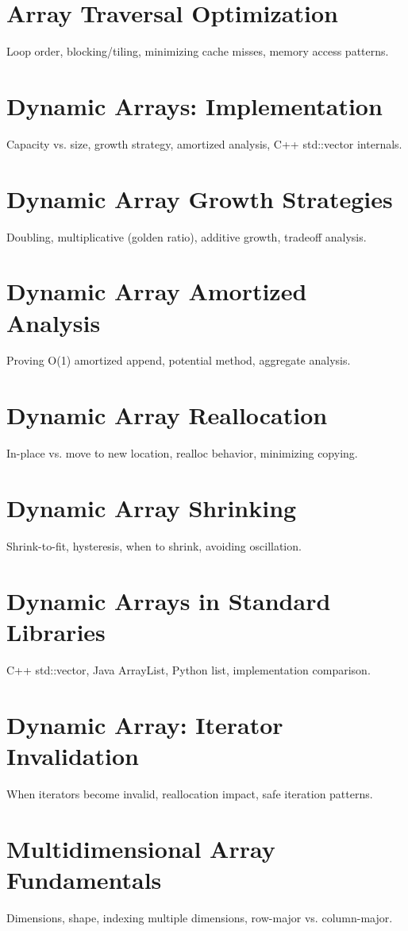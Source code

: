 \chapter{Array Traversal Optimization}
Loop order, blocking/tiling, minimizing cache misses, memory access patterns.

\chapter{Dynamic Arrays: Implementation}
Capacity vs. size, growth strategy, amortized analysis, C++ std::vector internals.

\chapter{Dynamic Array Growth Strategies}
Doubling, multiplicative (golden ratio), additive growth, tradeoff analysis.

\chapter{Dynamic Array Amortized Analysis}
Proving O(1) amortized append, potential method, aggregate analysis.

\chapter{Dynamic Array Reallocation}
In-place vs. move to new location, realloc behavior, minimizing copying.

\chapter{Dynamic Array Shrinking}
Shrink-to-fit, hysteresis, when to shrink, avoiding oscillation.

\chapter{Dynamic Arrays in Standard Libraries}
C++ std::vector, Java ArrayList, Python list, implementation comparison.

\chapter{Dynamic Array: Iterator Invalidation}
When iterators become invalid, reallocation impact, safe iteration patterns.

\chapter{Multidimensional Array Fundamentals}
Dimensions, shape, indexing multiple dimensions, row-major vs. column-major.

